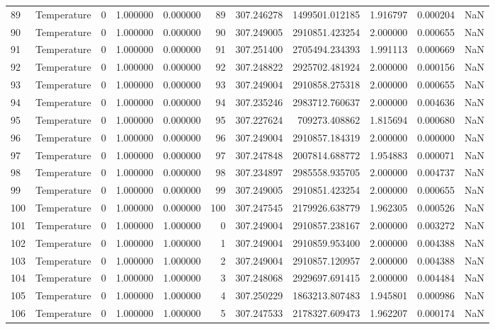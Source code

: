 \begin{tabular}{llrrrrrrrrr}
89 & Temperature & 0 & 1.000000 & 0.000000 & 89 & 307.246278 & 1499501.012185 & 1.916797 & 0.000204 & NaN \\
90 & Temperature & 0 & 1.000000 & 0.000000 & 90 & 307.249005 & 2910851.423254 & 2.000000 & 0.000655 & NaN \\
91 & Temperature & 0 & 1.000000 & 0.000000 & 91 & 307.251400 & 2705494.234393 & 1.991113 & 0.000669 & NaN \\
92 & Temperature & 0 & 1.000000 & 0.000000 & 92 & 307.248822 & 2925702.481924 & 2.000000 & 0.000156 & NaN \\
93 & Temperature & 0 & 1.000000 & 0.000000 & 93 & 307.249004 & 2910858.275318 & 2.000000 & 0.000655 & NaN \\
94 & Temperature & 0 & 1.000000 & 0.000000 & 94 & 307.235246 & 2983712.760637 & 2.000000 & 0.004636 & NaN \\
95 & Temperature & 0 & 1.000000 & 0.000000 & 95 & 307.227624 & 709273.408862 & 1.815694 & 0.000680 & NaN \\
96 & Temperature & 0 & 1.000000 & 0.000000 & 96 & 307.249004 & 2910857.184319 & 2.000000 & 0.000000 & NaN \\
97 & Temperature & 0 & 1.000000 & 0.000000 & 97 & 307.247848 & 2007814.688772 & 1.954883 & 0.000071 & NaN \\
98 & Temperature & 0 & 1.000000 & 0.000000 & 98 & 307.234897 & 2985558.935705 & 2.000000 & 0.004737 & NaN \\
99 & Temperature & 0 & 1.000000 & 0.000000 & 99 & 307.249005 & 2910851.423254 & 2.000000 & 0.000655 & NaN \\
100 & Temperature & 0 & 1.000000 & 0.000000 & 100 & 307.247545 & 2179926.638779 & 1.962305 & 0.000526 & NaN \\
101 & Temperature & 0 & 1.000000 & 1.000000 & 0 & 307.249004 & 2910857.238167 & 2.000000 & 0.003272 & NaN \\
102 & Temperature & 0 & 1.000000 & 1.000000 & 1 & 307.249004 & 2910859.953400 & 2.000000 & 0.004388 & NaN \\
103 & Temperature & 0 & 1.000000 & 1.000000 & 2 & 307.249004 & 2910857.120957 & 2.000000 & 0.004388 & NaN \\
104 & Temperature & 0 & 1.000000 & 1.000000 & 3 & 307.248068 & 2929697.691415 & 2.000000 & 0.004484 & NaN \\
105 & Temperature & 0 & 1.000000 & 1.000000 & 4 & 307.250229 & 1863213.807483 & 1.945801 & 0.000986 & NaN \\
106 & Temperature & 0 & 1.000000 & 1.000000 & 5 & 307.247533 & 2178327.609473 & 1.962207 & 0.000174 & NaN \\

\end{tabular}
